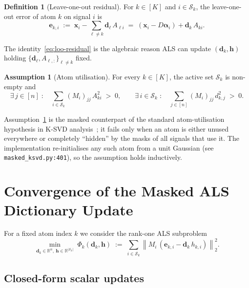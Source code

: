 \documentclass[journal,onecolumn,11pt]{IEEEtran}
\theoremstyle{definition}
\newtheorem{assumption}{Assumption}
\newtheorem{definition}{Definition}
\newcommand{\R}{\mathbb{R}}
\newcommand{\norm}[1]{\left\lVert #1 \right\rVert}
\newcommand{\Sk}{\mathcal{S}_k}
\newcommand{\dvec}{\bm{d}}
\newcommand{\hvec}{\bm{h}}
\newcommand{\xvec}{\bm{x}}
\newcommand{\alphavec}{\bm{\alpha}}
\begin{document}
\begin{definition}[Leave-one-out residual]
\label{def:loo-residual}
For $k\in[K]$ and $i\in\Sk$, the leave-one-out error of atom $k$ on
signal $i$ is
\begin{equation}
\bm{e}_{k,i} \;:=\; \xvec_i - \sum_{\ell\neq k} \dvec_\ell\, A_{\ell i}
\;=\; (\xvec_i - D\alphavec_i) + \dvec_k\, A_{ki}.
\label{eq:loo-residual}
\end{equation}
\end{definition}
The identity~\eqref{eq:loo-residual} is the algebraic reason ALS can
update $(\dvec_k,\hvec)$ holding $\{\dvec_\ell,A_{\ell,:}\}_{\ell\neq k}$ fixed.

\begin{assumption}[Atom utilisation]
\label{ass:utilisation}
For every $k\in[K]$, the active set $\Sk$ is non-empty and
\begin{equation}
\exists\,j\in[n]\;:\quad
  \sum_{i\in\Sk} (M_i)_{jj}\, A_{ki}^2 \;>\; 0,\qquad
\exists\,i\in\Sk\;:\quad
  \sum_{j\in[n]} (M_i)_{jj}\, d_{k,j}^2 \;>\; 0.
\label{eq:utilisation}
\end{equation}
\end{assumption}
Assumption~\ref{ass:utilisation} is the masked counterpart of the standard
atom-utilisation hypothesis in K-SVD analysis~\cite{aharon2006ksvd}; it
fails only when an atom is either unused everywhere or completely
``hidden'' by the masks of all signals that use it. The implementation
re-initialises any such atom from a unit Gaussian (see
\texttt{masked\_ksvd.py:401}), so the assumption holds inductively.

\section{Convergence of the Masked ALS Dictionary Update}
\label{sec:als}

For a fixed atom index $k$ we consider the rank-one ALS subproblem
\begin{equation}
\min_{\dvec_k\in\R^n,\ \hvec\in\R^{|\Sk|}}\;
\Phi_k(\dvec_k,\hvec) \;:=\;
\sum_{i\in\Sk} \norm{M_i\,(\bm{e}_{k,i}-\dvec_k\, h_{k,i})}_2^2.
\label{eq:phi-k}
\end{equation}

\subsection{Closed-form scalar updates}
\label{sec:closed-form}
\end{document}

